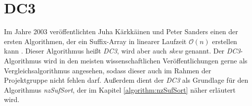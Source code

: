 \section{DC3}
\label{algorithm:dc3}

Im  Jahre 2003 veröffentlichten Juha Kärkkäinen und Peter Sanders einen der ersten Algorithmen, der ein Suffix-Array in linearer Laufzeit $\mathcal{O}(n)$ erstellen kann \cite{saca:9}. Dieser Algorithmus heißt \emph{DC3}, wird aber auch \emph{skew} genannt. Der \emph{DC3}-Algorithmus wird in den meisten wissenschaftlichen Veröffentlichungen gerne als Vergleichsalgorithmus angesehen, sodass dieser auch im Rahmen der Projektgruppe \sacabench nicht fehlen darf. Außerdem dient der \emph{DC3} als Grundlage für den Algorithmus \emph{nzSufSort}, der im Kapitel \ref{algorithm:nzSufSort} näher erläutert wird.








